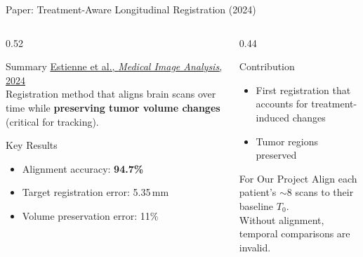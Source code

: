 \documentclass[aspectratio=169,xcolor=dvipsnames]{beamer}
\begin{document}
\begin{frame}{Paper: Treatment-Aware Longitudinal Registration (2024)}
    \begin{columns}
        \begin{column}{0.52\textwidth}
            \begin{block}{Summary}
                \small
                \href{https://doi.org/10.1016/j.media.2024.103148}{Estienne et al., \textit{Medical Image Analysis}, 2024}\\[0.3em]
                Registration method that aligns brain scans over time while \textbf{preserving tumor volume changes} (critical for tracking).
            \end{block}

            \vspace{0.2em}

            \begin{block}{Key Results}
                \small
                \begin{itemize}
                    \item Alignment accuracy: \textbf{94.7\%}
                    \item Target registration error: 5.35\,mm
                    \item Volume preservation error: 11\%
                \end{itemize}
            \end{block}
        \end{column}

        \begin{column}{0.44\textwidth}
            \begin{block}{Contribution}
                \small
                \begin{itemize}
                    \item First registration that accounts for treatment-induced changes
                    \item Tumor regions preserved
                \end{itemize}
            \end{block}

            \vspace{0.2em}

            \begin{alertblock}{For Our Project}
                \small
                Align each patient's $\sim$8 scans to their baseline $T_0$.\\
                Without alignment, temporal comparisons are invalid.
            \end{alertblock}


\end{column}
\end{columns}
\end{frame}
\end{document}
